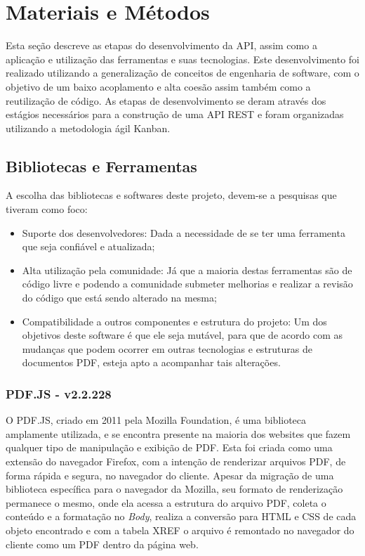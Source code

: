 \chapter{Materiais e Métodos}

Esta seção descreve as etapas do desenvolvimento da API, assim como a aplicação e utilização das ferramentas e suas tecnologias. Este desenvolvimento foi realizado utilizando a generalização de conceitos de engenharia de software, com o objetivo de um baixo acoplamento e alta coesão assim também como a reutilização de código. As etapas de desenvolvimento se deram através dos estágios necessários para a construção de uma API REST e foram organizadas utilizando a metodologia ágil Kanban.

\section{Bibliotecas e Ferramentas}

A escolha das bibliotecas e softwares deste projeto, devem-se a pesquisas que tiveram como foco: 
\begin{itemize}
    \item Suporte dos desenvolvedores: Dada a necessidade de se ter uma ferramenta que seja confiável e atualizada;
    \item Alta utilização pela comunidade: Já que a maioria destas ferramentas são de código livre e podendo a comunidade submeter melhorias e realizar a revisão do código que está sendo alterado na mesma;
    \item Compatibilidade a outros componentes e estrutura do projeto: Um dos objetivos deste software é que ele seja mutável, para que de acordo com as mudanças que podem ocorrer em outras tecnologias e estruturas de documentos PDF, esteja apto a acompanhar tais alterações.
\end{itemize}

\subsection{PDF.JS - v2.2.228}

O PDF.JS, criado em 2011 pela Mozilla Foundation, é uma biblioteca amplamente utilizada, e se encontra presente na maioria dos websites que fazem qualquer tipo de manipulação e exibição de PDF. Esta foi criada como uma extensão do navegador Firefox, com a intenção de renderizar arquivos PDF, de forma rápida e segura, no navegador do cliente. Apesar da migração de uma biblioteca específica para o navegador da Mozilla, seu formato de renderização permanece o mesmo, onde ela acessa a estrutura do arquivo PDF, coleta o conteúdo e a formatação no \textit{Body}, realiza a conversão para HTML e CSS de cada objeto encontrado e com a tabela XREF o arquivo é remontado no navegador do cliente como um PDF dentro da página web.

